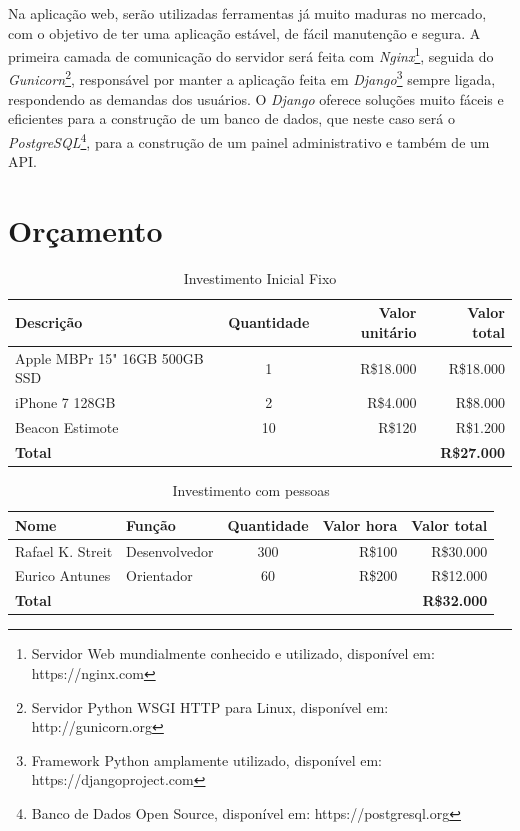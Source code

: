 \documentclass[
	12pt,
	oneside,
	a4paper,
	english,
	brazil,
]{abntex2}
\begin{document}
Na aplicação web, serão utilizadas ferramentas já muito maduras no mercado, com o objetivo de ter uma aplicação estável, de fácil manutenção e segura. A primeira camada de comunicação do servidor será feita com \emph{Nginx}\footnote{Servidor Web mundialmente conhecido e utilizado, disponível em: https://nginx.com}, seguida do \emph{Gunicorn}\footnote{Servidor Python WSGI HTTP para Linux, disponível em: http://gunicorn.org}, responsável por manter a aplicação feita em \emph{Django}\footnote{Framework Python amplamente utilizado, disponível em: https://djangoproject.com} sempre ligada, respondendo as demandas dos usuários. O \emph{Django} oferece soluções muito fáceis e eficientes para a construção de um banco de dados, que neste caso será o \emph{PostgreSQL}\footnote{Banco de Dados Open Source, disponível em: https://postgresql.org}, para a construção de um painel administrativo e também de um API.



\chapter{Orçamento}

\noindent
\begin{table}[ht]
    \caption{Investimento Inicial Fixo}
    
    \begin{tabularx}{\textwidth}{X|c|r|r}
    \hline
        \textbf{Descrição} &
        \textbf{Quantidade} & 
        \textbf{Valor unitário} & 
        \textbf{Valor total} \\
    \hline
        Apple MBPr 15" 16GB 500GB SSD&1&R\$18.000&R\$18.000 \\
        iPhone 7 128GB&2&R\$4.000&R\$8.000 \\
        Beacon Estimote&10&R\$120&R\$1.200 \\ [1ex]
    \hline
        \textbf{Total}&&&\textbf{R\$27.000} \\ [1ex]
    \end{tabularx}
\end{table}

\noindent
\begin{table}[ht]
    \caption{Investimento com pessoas}

    \begin{tabularx}{\textwidth}{X|l|c|r|r}
    \hline
        \textbf{Nome} & 
        \textbf{Função} & 
        \textbf{Quantidade} & 
        \textbf{Valor hora} &
        \textbf{Valor total} \\
    \hline
        Rafael K. Streit&Desenvolvedor &300&R\$100&R\$30.000\\
        Eurico Antunes&Orientador&60&R\$200&R\$12.000 \\
    \hline
        \textbf{Total} &&&& \textbf{R\$32.000} \\
    \end{tabularx}
\end{table}
\end{document}
